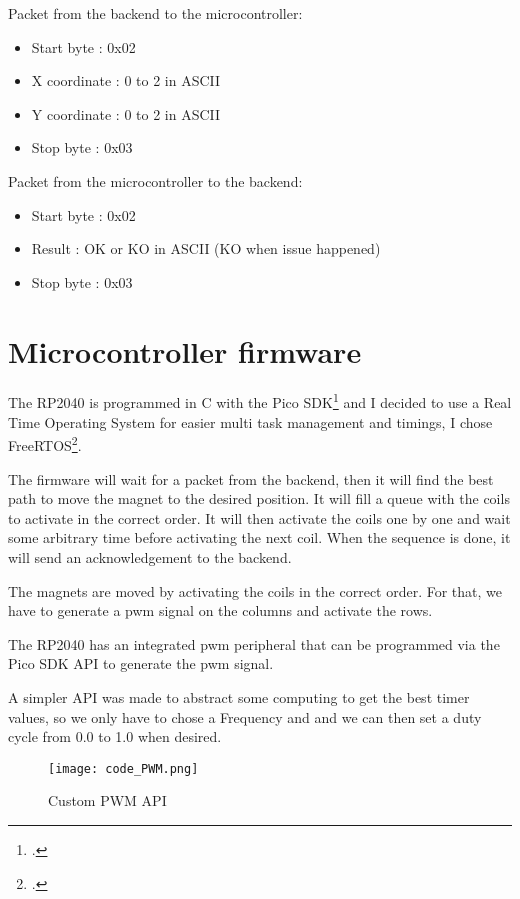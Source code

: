 Packet from the backend to the microcontroller:
\begin{itemize}
	\item Start byte : 0x02
	\item X coordinate : 0 to 2 in ASCII
	\item Y coordinate : 0 to 2 in ASCII
	\item Stop byte : 0x03
\end{itemize}

Packet from the microcontroller to the backend:
\begin{itemize}
	\item Start byte : 0x02
	\item Result : OK or KO in ASCII (KO when issue happened)
	\item Stop byte : 0x03
\end{itemize}

\newpage

\section{Microcontroller firmware}

The RP2040 is programmed in C with the Pico SDK\footcite{noauthor_hardware_nodate} and I decided to use a Real Time Operating System for easier multi task management and timings, I chose FreeRTOS\footcite{noauthor_freertos_nodate}.

The firmware will wait for a packet from the backend, then it will find the best path to move the magnet to the desired position. It will fill a queue with the coils to activate in the correct order. It will then activate the coils one by one and wait some arbitrary time before activating the next coil. When the sequence is done, it will send an acknowledgement to the backend.

The magnets are moved by activating the coils in the correct order. For that, we have to generate a \gls{pwm} signal on the columns and activate the rows.

The RP2040 has an integrated \gls{pwm} peripheral that can be programmed via the Pico SDK API to generate the \gls{pwm} signal.

A simpler API was made to abstract some computing to get the best timer values, so we only have to chose a Frequency and and we can then set a duty cycle from 0.0 to 1.0 when desired.

\begin{figure}[H]
	\centering
	\texttt{[image: code\_PWM.png]}
	\caption[Custom PWM API]{Custom PWM API}
	\label{fig:pwm_api}
\end{figure}


